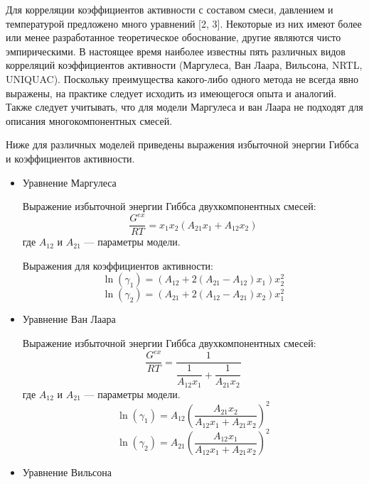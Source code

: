 Для корреляции коэффициентов активности с составом смеси, давлением и температурой предложено много уравнений [2, 3]. Некоторые из них имеют более или менее разработанное теоретическое обоснование, другие являются чисто эмпирическими. В настоящее время наиболее известны пять различных видов корреляций коэффициентов активности (Маргулеса, Ван Лаара, Вильсона, NRTL, UNIQUAC). Поскольку преимущества какого-либо одного метода не всегда явно выражены, на практике следует исходить из имеющегося опыта и аналогий. Также следует учитывать, что для модели Маргулеса и ван Лаара не подходят для описания многокомпонентных смесей.

Ниже для различных моделей приведены выражения избыточной энергии Гиббса и коэффициентов активности.
\begin{itemize}
	\item Уравнение Маргулеса
	
	Выражение избыточной энергии Гиббса двухкомпонентных смесей:
	\begin{equation}
	\frac{G^{ex}}{RT}=x_1 x_2 (A_{21} x_1+ A_{12} x_2)
	\end{equation}
	где $A_{12}$ и $A_{21}$ --- параметры модели.
	
	Выражения для коэффициентов активности:
	\begin{equation}
	\ln(\gamma_1)=(A_{12}+2(A_{21}-A_{12})x_1)x_2^2
	\end{equation}
	\begin{equation}
	\ln(\gamma_2)=(A_{21}+2(A_{12}-A_{21})x_2)x_1^2
	\end{equation}
	
	\item Уравнение Ван Лаара
	
	Выражение избыточной энергии Гиббса двухкомпонентных смесей:
	\begin{equation}
	\frac{G^{ex}}{RT}=\dfrac{1}{\dfrac{1}{A_{12} x_1}+ \dfrac{1}{A_{21}x_2}}
	\end{equation}
	где $A_{12}$ и $A_{21}$ --- параметры модели.
	\begin{equation}
	\ln(\gamma_1)=A_{12}\left( \dfrac{A_{21}x_2}{A_{12}x_1 + A_{21} x_2}\right)^2
	\end{equation}
	\begin{equation}
	\ln(\gamma_2)=A_{21}\left( \dfrac{A_{12}x_1}{A_{12}x_1 + A_{21} x_2}\right)^2
	\end{equation}
	
	\item Уравнение Вильсона
	

\end{itemize}
